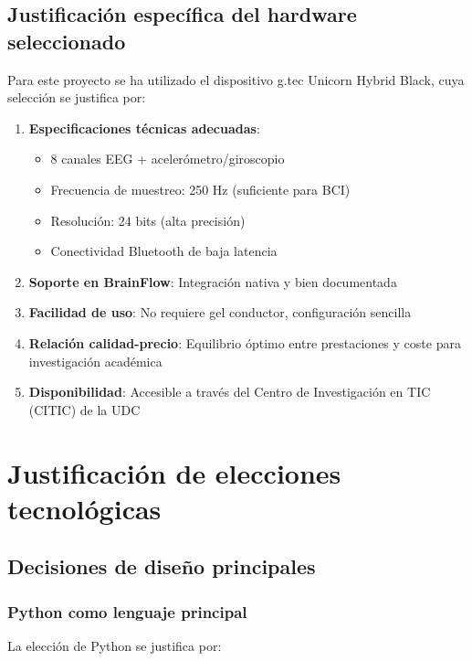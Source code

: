 \begin{itemize}
\subsection{Justificación específica del hardware seleccionado}
\label{subsec:justificacion_hardware}

Para este proyecto se ha utilizado el dispositivo g.tec Unicorn Hybrid Black, cuya selección se justifica por:

\begin{enumerate}
    \item \textbf{Especificaciones técnicas adecuadas}:
    \begin{itemize}
        \item 8 canales EEG + acelerómetro/giroscopio
        \item Frecuencia de muestreo: 250 Hz (suficiente para BCI)
        \item Resolución: 24 bits (alta precisión)
        \item Conectividad Bluetooth de baja latencia
    \end{itemize}

    \item \textbf{Soporte en BrainFlow}: Integración nativa y bien documentada

    \item \textbf{Facilidad de uso}: No requiere gel conductor, configuración sencilla

    \item \textbf{Relación calidad-precio}: Equilibrio óptimo entre prestaciones y coste para investigación académica

    \item \textbf{Disponibilidad}: Accesible a través del Centro de Investigación en TIC (CITIC) de la UDC
\end{enumerate}

\section{Justificación de elecciones tecnológicas}
\label{sec:justificacion_tecnologias}

\subsection{Decisiones de diseño principales}
\label{subsec:decisiones_diseno}

\subsubsection{Python como lenguaje principal}
La elección de Python se justifica por:


\end{itemize}
